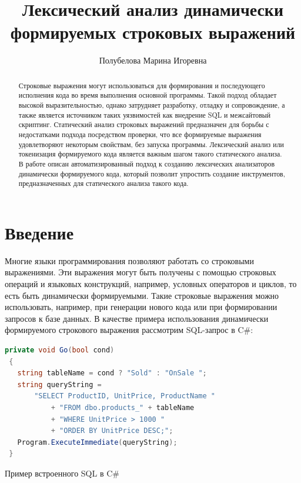 
\title{Лексический анализ динамически формируемых строковых выражений}


\author{Полубелова Марина Игоревна}



\maketitle             

\begin{abstract}
Строковые выражения могут использоваться для формирования и последующего исполнения кода во время выполнения основной программы. Такой подход обладает высокой выразительностью, однако затрудняет разработку, отладку и сопровождение, а также является источником таких уязвимостей как внедрение SQL и межсайтовый скриптинг. Статический анализ строковых выражений предназначен для борьбы с недостатками подхода посредством проверки, что все формируемые выражения удовлетворяют некоторым свойствам, без запуска программы. Лексический анализ или токенизация формируемого кода является важным шагом такого статического анализа. В работе описан автоматизированный подход к созданию лексических анализаторов динамически формируемого кода, который позволит упростить создание инструментов, предназначенных для статического анализа такого кода.
\end{abstract}



\section*{Введение}

Многие языки программирования позволяют работать со строковыми выражениями. Эти выражения могут быть получены с помощью строковых операций и языковых конструкций, например, условных операторов и циклов, то есть быть динамически формируемыми. Такие строковые выражения можно использовать, например, при генерации нового кода или при формировании запросов к базе данных. В качестве примера использования динамически формируемого строкового выражения рассмотрим SQL-запрос в C\#:    

\begin{listing}[H]
    \begin{lstlisting}[language=csharp]
 private void Go(bool cond)
 {
   string tableName = cond ? "Sold" : "OnSale ";
   string queryString =
       "SELECT ProductID, UnitPrice, ProductName " 
           + "FROM dbo.products_" + tableName
           + "WHERE UnitPrice > 1000 "
           + "ORDER BY UnitPrice DESC;";
   Program.ExecuteImmediate(queryString);
 }
    \end{lstlisting}
\caption{Пример встроенного SQL в C\#}
\label{lst:verbments}
\end{listing}

